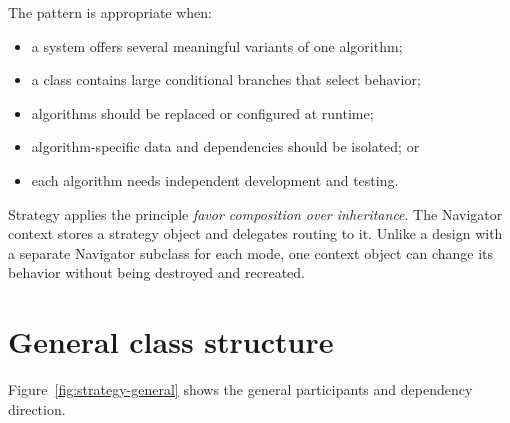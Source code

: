 \documentclass[11pt,a4paper]{report}
\begin{document}
The pattern is appropriate when:
\begin{itemize}
  \item a system offers several meaningful variants of one algorithm;
  \item a class contains large conditional branches that select behavior;
  \item algorithms should be replaced or configured at runtime;
  \item algorithm-specific data and dependencies should be isolated; or
  \item each algorithm needs independent development and testing.
\end{itemize}

Strategy applies the principle \emph{favor composition over inheritance}. The
Navigator context stores a strategy object and delegates routing to it. Unlike a
design with a separate Navigator subclass for each mode, one context object can
change its behavior without being destroyed and recreated.

\section{General class structure}
Figure~\ref{fig:strategy-general} shows the general participants and dependency
direction.
\end{document}
